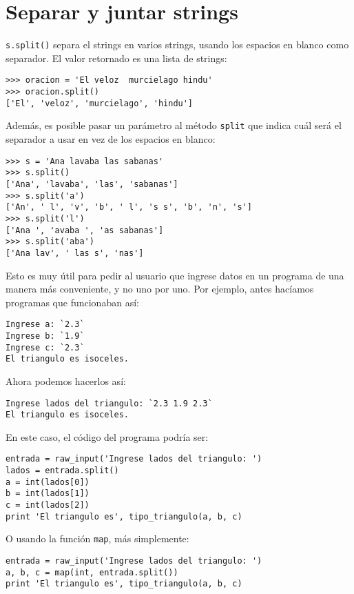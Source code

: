 \section{Separar y juntar strings}

\lstinline!s.split()! separa el strings en varios strings, usando los
espacios en blanco como separador. El valor retornado es una lista de
strings:

\begin{lstlisting}
>>> oracion = 'El veloz  murcielago hindu'
>>> oracion.split()
['El', 'veloz', 'murcielago', 'hindu']
\end{lstlisting}

Además, es posible pasar un parámetro al método \lstinline!split! que
indica cuál será el separador a usar en vez de los espacios en blanco:

\begin{lstlisting}
>>> s = 'Ana lavaba las sabanas'
>>> s.split()
['Ana', 'lavaba', 'las', 'sabanas']
>>> s.split('a')
['An', ' l', 'v', 'b', ' l', 's s', 'b', 'n', 's']
>>> s.split('l')
['Ana ', 'avaba ', 'as sabanas']
>>> s.split('aba')
['Ana lav', ' las s', 'nas']
\end{lstlisting}

Esto es muy útil para pedir al usuario que ingrese datos en un programa
de una manera más conveniente, y no uno por uno. Por ejemplo, antes
hacíamos programas que funcionaban así:
\begin{lstlisting}[language=testcase]
Ingrese a: `2.3`
Ingrese b: `1.9`
Ingrese c: `2.3`
El triangulo es isoceles.
\end{lstlisting}

Ahora podemos hacerlos así:
\begin{lstlisting}[language=testcase]
Ingrese lados del triangulo: `2.3 1.9 2.3`
El triangulo es isoceles.
\end{lstlisting}

En este caso, el código del programa podría ser:

\begin{lstlisting}
entrada = raw_input('Ingrese lados del triangulo: ')
lados = entrada.split()
a = int(lados[0])
b = int(lados[1])
c = int(lados[2])
print 'El triangulo es', tipo_triangulo(a, b, c)
\end{lstlisting}

O usando la función \lstinline!map!, más simplemente:

\begin{lstlisting}
entrada = raw_input('Ingrese lados del triangulo: ')
a, b, c = map(int, entrada.split())
print 'El triangulo es', tipo_triangulo(a, b, c)
\end{lstlisting}


